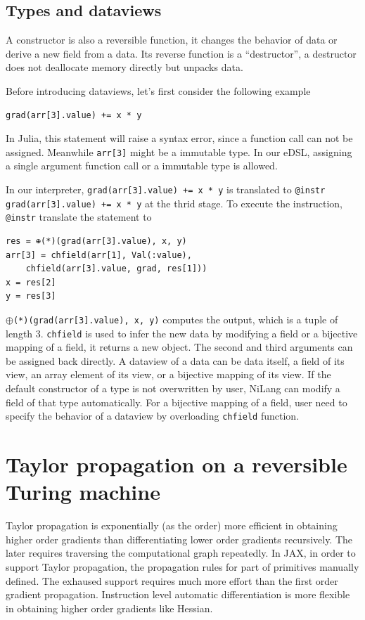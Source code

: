 \documentclass[aps,twocolumn,longbibliography,english,superscriptaddress,prr]{revtex4-1}
\newcommand{\<}{\langle}
\renewcommand{\>}{\rangle}
\theoremstyle{definition}\newtheorem{definition}{\textit{Definition}}
\begin{document}
\subsection{Types and dataviews}
A constructor is also a reversible function, it changes the behavior of data or derive a new field from a data.
Its reverse function is a ``destructor'', a destructor does not deallocate memory directly but unpacks data.

Before introducing dataviews, let's first consider the following example
\begin{minipage}{.44\textwidth}
\begin{lstlisting}
grad(arr[3].value) += x * y
\end{lstlisting}
\end{minipage}
In Julia, this statement will raise a syntax error, since a function call can not be assigned.
Meanwhile \texttt{arr[3]} might be a immutable type.
In our eDSL, assigning a single argument function call or a immutable type is allowed.

In our interpreter, \texttt{grad(arr[3].value) += x * y} is translated to \texttt{@instr grad(arr[3].value) += x * y} at the thrid stage.
To execute the instruction, \texttt{@instr} translate the statement to
\begin{minipage}{.44\textwidth}
\begin{lstlisting}
res = ⊕(*)(grad(arr[3].value), x, y)
arr[3] = chfield(arr[1], Val(:value), 
    chfield(arr[3].value, grad, res[1]))
x = res[2]
y = res[3]
\end{lstlisting}
\end{minipage}
\texttt{$\oplus$(*)(grad(arr[3].value), x, y)} computes the output, which is a tuple of length $3$.
\texttt{chfield} is used to infer the new data by modifying a field or a bijective mapping of a field, it returns a new object.
The second and third arguments can be assigned back directly.
A dataview of a data can be data itself, a field of its view, an array element of its view, or a bijective mapping of its view.
If the default constructor of a type is not overwritten by user, NiLang can modify a field of that type automatically.
For a bijective mapping of a field, user need to specify the behavior of a dataview by overloading \texttt{chfield} function.

\section{Taylor propagation on a reversible Turing machine}
Taylor propagation is exponentially (as the order) more efficient in obtaining higher order gradients than differentiating lower order gradients recursively.
The later requires traversing the computational graph repeatedly.
In JAX, in order to support Taylor propagation, the propagation rules for part of primitives manually defined.
The exhaused support requires much more effort than the first order gradient propagation.
Instruction level automatic differentiation is more flexible in obtaining higher order gradients like Hessian.
\end{document}
